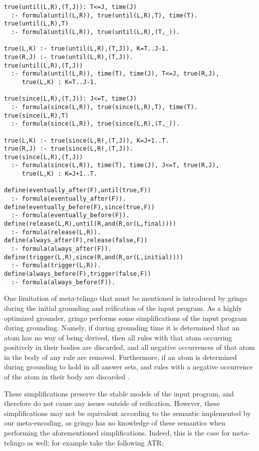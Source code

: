 \begin{center}
\begin{minipage}{\linewidth}
  \begin{lstlisting}[]
true(until(L,R),(T,J)): T<=J, time(J)
  :- formula(until(L,R)), true(until(L,R),T), time(T).
true(until(L,R),T)
  :- formula(until(L,R)), true(until(L,R),(T,_)).

true(L,K) :- true(until(L,R),(T,J)), K=T..J-1.
true(R,J) :- true(until(L,R),(T,J)).
true(until(L,R),(T,J))
  :- formula(until(L,R)), time(T), time(J), T<=J, true(R,J), 
     true(L,K) : K=T..J-1.

true(since(L,R),(T,J)): J<=T, time(J)
  :- formula(since(L,R)), true(since(L,R),T), time(T).
true(since(L,R),T)
  :- formula(since(L,R)), true(since(L,R),(T,_)).

true(L,K) :- true(since(L,R),(T,J)), K=J+1..T.
true(R,J) :- true(since(L,R),(T,J)).
true(since(L,R),(T,J))
  :- formula(since(L,R)), time(T), time(J), J<=T, true(R,J), 
     true(L,K) : K=J+1..T.

define(eventually_after(F),until(true,F)) 
  :- formula(eventually_after(F)).
define(eventually_before(F),since(true,F)) 
  :- formula(eventually_before(F)).
define(release(L,R),until(R,and(R,or(L,final)))) 
  :- formula(release(L,R)).
define(always_after(F),release(false,F))
  :- formula(always_after(F)).
define(trigger(L,R),since(R,and(R,or(L,initial))))
  :- formula(trigger(L,R)).
define(always_before(F),trigger(false,F)) 
  :- formula(always_before(F)).
\end{lstlisting}
\end{minipage}
\end{center}

One limitation of meta-telingo that must be mentioned is introduced by
gringo during the initial grounding and reification of the input
program. As a highly optimized grounder, gringo performs some
simplifications of the input program during grounding. Namely, if
during grounding time it is determined that an atom has no way of
being derived, then all rules with that atom occurring positively in
their bodies are discarded, and all negative occurrences of that atom
in the body of any rule are removed. Furthermore, if an atom is
determined during grounding to hold in all answer sets, and rules with
a negative occurrence of the atom in their body are discarded \cite{gekakasc12a}.

These simplifications preserve the stable models of the input program,
and therefore do not cause any issues outside of reification. However,
these simplifications may not be equivalent according to the semantic
implemented by our meta-encoding, as gringo has no knowledge of these
semantics when performing the aforementioned simplifications. Indeed,
this is the case for meta-telingo as well; for example take the
following ATR:

